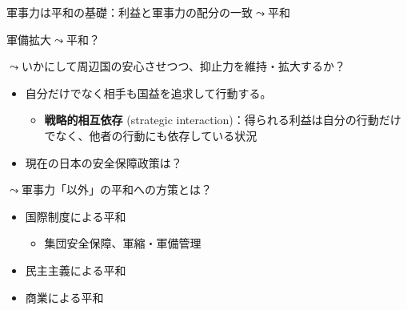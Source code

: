 \documentclass[
  xelatex,
  ja=standard]{bxjsarticle}
\providecommand{\tightlist}{%
  \setlength{\itemsep}{0pt}\setlength{\parskip}{0pt}}\usepackage{longtable,booktabs,array}
\begin{document}
軍事力は平和の基礎：利益と軍事力の配分の一致\(\leadsto\)平和

軍備拡大\(\leadsto\)平和？

\(\leadsto\)いかにして周辺国の安心させつつ、抑止力を維持・拡大するか？

\begin{itemize}
\tightlist
\item
  自分だけでなく相手も国益を追求して行動する。

  \begin{itemize}
  \tightlist
  \item
    \textbf{戦略的相互依存} (strategic
    interaction)：得られる利益は自分の行動だけでなく、他者の行動にも依存している状況
  \end{itemize}
\item
  現在の日本の安全保障政策は？
\end{itemize}

\(\leadsto\)軍事力「以外」の平和への方策とは？

\begin{itemize}
\tightlist
\item
  国際制度による平和

  \begin{itemize}
  \tightlist
  \item
    集団安全保障、軍縮・軍備管理
  \end{itemize}
\item
  民主主義による平和
\item
  商業による平和
\end{itemize}


  
\end{document}
